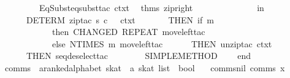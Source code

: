 \begin{isabellebody}
\ \ \ \ \ \ \ \ {}\ EqSubst{}eqsubst{}tac\ ctxt\ {}{}{}\ %
\isaantiq
thms\ zip{}right{}%
\endisaantiq
\ {}\isanewline
\ \ \ \ \ \ \ \ {}\isanewline
\ \ \ \ in\isanewline
\ \ \ \ \ \ DETERM\ {}zip{}tac\ s\ {}c\ {}\ {}{}\ ctxt\ {}{}\isanewline
\ \ \ \ \ \ THEN\ {}if\ m\ {}\ {}\isanewline
\ \ \ \ \ \ \ \ \ \ \ \ then\ {}CHANGED\ {}REPEAT\ move{}left{}tac{}{}\isanewline
\ \ \ \ \ \ \ \ \ \ \ \ else\ {}NTIMES\ m\ move{}left{}tac{}{}\isanewline
\ \ \ \ \ \ THEN\ unzip{}tac\ ctxt\ {}\isanewline
\ \ \ \ \ \ THEN\ seq{}deselect{}tac\ {}\isanewline
\ \ \ \ \ \ {}{}\ SIMPLE{}METHOD\isanewline
\ \ \ \ end{}\isanewline
{}%
\endisatagML
{\isafoldML}%
%
\isadelimML
\isanewline
%
\endisadelimML
\isanewline
{}\isamarkupfalse%
\ comms\ {}{}\ {}{}a{}{}ranked{}alphabet\ skat\ {}\ {}a\ skat\ list\ {}\ bool{}\ \isanewline
\ \ comms{}nil{}\ {}comms\ x\ {}{}{}\isanewline

\end{isabellebody}
